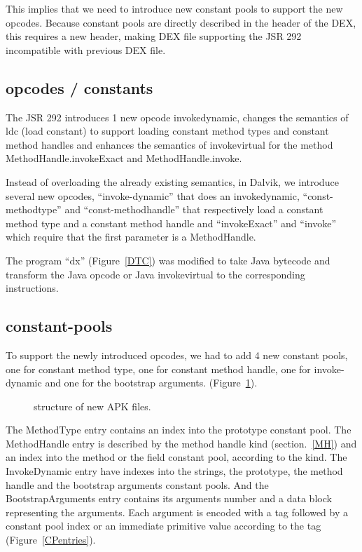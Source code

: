 \documentclass{sig-alternate}
\def \Jsr{JSR\xspace}
\def \JSR{\Jsr 292\xspace}
\begin{document}
  This implies that we need to introduce new constant pools to support the new opcodes.
  Because constant pools are directly described in the header of the DEX,
  this requires a new header, making DEX file supporting the JSR 292 incompatible
  with previous DEX file.
  
  \subsection{opcodes / constants}
    The \JSR introduces 1 new opcode invokedynamic, changes the semantics of ldc (load constant)
    to support loading constant method types and constant method handles and enhances the semantics
    of invokevirtual for the method MethodHandle.invokeExact and MethodHandle.invoke.

    Instead of overloading the already existing semantics, in Dalvik, we introduce several new opcodes,
    ``invoke-dynamic'' that does an invokedynamic,
    ``const-methodtype'' and ``const-methodhandle'' that respectively load a constant method type
    and a constant method handle and ``invokeExact'' and ``invoke'' which require that the first parameter
    is a MethodHandle.

    The program ``dx'' (Figure~\ref{DTC}) was modified to take Java bytecode and 
    transform the Java opcode or Java invokevirtual to the corresponding instructions.

  \subsection{constant-pools}
    \label{CP}

    To support the newly introduced opcodes, we had to add 4 new constant pools,
    one for constant method type, one for constant method handle, one for invoke-dynamic
    and one for the bootstrap arguments. (Figure~\ref{SNA}).

    \begin{figure}[!ht]
      \centering \resizebox{.45\linewidth}{!}{}
      \caption{structure of new APK files.}
      \label{SNA}
    \end{figure}

    The MethodType entry contains an index into the prototype constant pool.
    The MethodHandle entry is described by the method handle kind (section.~\ref{MH})
    and an index into the method or the field constant pool, according to the kind.
    The InvokeDynamic entry have indexes into the strings, the prototype,
    the method handle and the bootstrap arguments constant pools.
    And the BootstrapArguments entry contains its arguments number
    and a data block representing the arguments.
    Each argument is encoded with a tag followed by a constant pool index or
    an immediate primitive value according to the tag (Figure~\ref{CPentries}).
\end{document}
